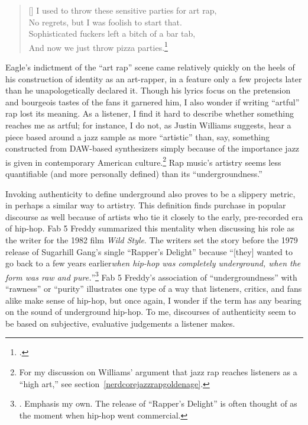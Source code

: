 \settowidth{\versewidth}{I used to throw these sensitive parties for art rap,}
    \begin{verse}[\versewidth]
        I used to throw these sensitive parties for art rap, \\
        No regrets, but I was foolish to start that. \\
        Sophisticated fuckers left a bitch of a bar tab, \\
        And now we just throw pizza parties.\footnote{
        \cite{milo2013}.}
    \end{verse}
Eagle's indictment of the ``art rap'' scene came relatively quickly on the heels of his construction of
identity as an art-rapper, in a feature only a few projects later than he unapologetically declared
it. Though his lyrics focus on the pretension and bourgeois tastes of the fans it garnered him, I also 
wonder if writing ``artful'' rap lost its meaning. As a listener, I find it hard to describe whether
something reaches me as artful; for instance, I do not, as Justin Williams suggests, hear a piece based 
around a jazz sample as more ``artistic'' than, say, something constructed from DAW-based synthesizers 
simply because of the importance jazz is given in contemporary American culture.\footnote{
    For my discussion on Williams' argument that jazz rap reaches listeners as a ``high art,'' see
    section~\ref{nerdcorejazzrapgoldenage}.} 
Rap music's artistry seems less quantifiable (and more personally defined) than its ``undergroundness.''

Invoking authenticity to define underground also proves to be a slippery metric, in perhaps a similar way
to artistry. This definition finds purchase in popular discourse as well because of artists who tie it
closely to the early, pre-recorded era of hip-hop. Fab 5 Freddy summarized this mentality when discussing 
his role as the writer for the 1982 film \textit{Wild Style}. The writers set the story before the 1979
release of Sugarhill Gang's single ``Rapper's Delight'' because ``[they] wanted to go back to a few years 
earlier\textellipsis \emph{when hip-hop was completely underground, when the form was raw and pure.}''\footnote{
    \autocite[23]{justinawilliamsRhyminStealinMusical2013}. Emphasis my own. The release
    of ``Rapper's Delight'' is often thought of as the moment when hip-hop went commercial.}
Fab 5 Freddy's association of ``undergroundness'' with ``rawness'' or ``purity'' illustrates one type
of a way that listeners, critics, and fans alike make sense of hip-hop, but once again, I wonder if the
term has any bearing on the sound of underground hip-hop. To me, discourses of authenticity seem to be
based on subjective, evaluative judgements a listener makes.

